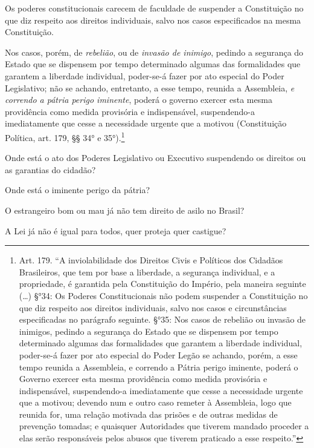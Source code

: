 Os poderes constitucionais carecem de faculdade de suspender a
Constituição no que diz respeito aos direitos individuais, salvo nos
casos especificados na mesma Constituição.

Nos casos, porém, de \emph{rebelião}, ou de \emph{invasão de inimigo},
pedindo a segurança do Estado que se dispensem por tempo determinado
algumas das formalidades que garantem a liberdade individual, poder-se-á
fazer por ato especial do Poder Legislativo; não se achando, entretanto,
a esse tempo, reunida a Assembleia, \emph{e correndo a pátria perigo
iminente}, poderá o governo exercer esta mesma providência como medida
provisória e indispensável, suspendendo-a imediatamente que cesse a
necessidade urgente que a motivou (Constituição Política,
art. 179, §§ 34° e 35°).\footnote{Art. 179. ``A inviolabilidade dos
  Direitos Civis e Políticos dos Cidadãos Brasileiros, que tem por base
  a liberdade, a segurança individual, e a propriedade, é garantida pela
  Constituição do Império, pela maneira seguinte (\ldots{}) §°34: Os Poderes
  Constitucionais não podem suspender a Constituição no que diz respeito
  aos direitos individuais, salvo nos casos e circunstâncias
  especificadas no parágrafo seguinte.
  §°35: Nos casos de rebelião ou invasão de inimigos, pedindo a
  segurança do Estado que se dispensem por tempo determinado algumas das
  formalidades que garantem a liberdade individual, poder-se-á fazer por
  ato especial do Poder Legão se achando, porém, a esse tempo
  reunida a Assembleia, e correndo a Pátria perigo iminente, poderá o
  Governo exercer esta mesma providência como medida provisória e
  indispensável, suspendendo-a imediatamente que cesse a necessidade
  urgente que a motivou; devendo num e outro caso remeter à Assembleia,
  logo que reunida for, uma relação motivada das prisões e de outras
  medidas de prevenção tomadas; e quaisquer Autoridades que tiverem
  mandado proceder a elas serão responsáveis pelos abusos que tiverem
  praticado a esse respeito.''}

Onde está o ato dos Poderes Legislativo ou Executivo suspendendo os
direitos ou as garantias do cidadão?

Onde está o iminente perigo da pátria?

O estrangeiro bom ou mau já não tem direito de asilo no Brasil?

A Lei já não é igual para todos, quer proteja quer castigue?

